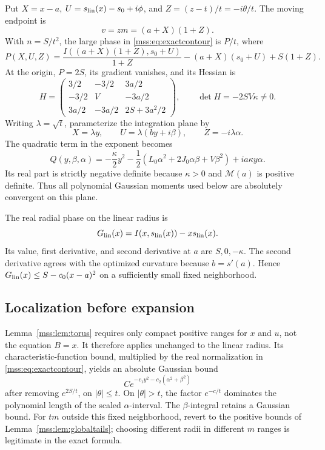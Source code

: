\documentclass[11pt,letterpaper]{article}
\numberwithin{equation}{section}
\theoremstyle{definition}\newtheorem{definition}[theorem]{Definition}
\theoremstyle{remark}\newtheorem{remark}[theorem]{Remark}
\begin{document}
Put $X=x-a$, $U=s_{\rm lin}(x)-s_0+i\phi$, and $Z=(z-t)/t=-i\theta/t$. The moving endpoint is
\begin{equation}\label{mss:eq:movingendpoint}
v=zm=(a+X)(1+Z).
\end{equation}
With $n=S/t^2$, the large phase in \eqref{mss:eq:exactcontour} is $P/t$, where
\begin{equation}\label{mss:eq:P}
P(X,U,Z)=\frac{I((a+X)(1+Z),s_0+U)}{1+Z}
-(a+X)(s_0+U)+S(1+Z).
\end{equation}
At the origin, $P=2S$, its gradient vanishes, and its Hessian is
\begin{equation}\label{mss:eq:Hessian}
H=\begin{pmatrix}
3/2&-3/2&3a/2\\
-3/2&V&-3a/2\\
3a/2&-3a/2&2S+3a^2/2
\end{pmatrix},\qquad
\det H=-2SV\kappa\ne0.
\end{equation}
Writing $\lambda=\sqrt t$, parameterize the integration plane by
\begin{equation}\label{mss:eq:plane}
X=\lambda y,\qquad U=\lambda(by+i\beta),\qquad
Z=-i\lambda\alpha.
\end{equation}
The quadratic term in the exponent becomes
\begin{equation}\label{mss:eq:Q}
Q(y,\beta,\alpha)
=-\frac\kappa2y^2
-\frac12(L_0\alpha^2+2J_0\alpha\beta+V\beta^2)
+ia\kappa y\alpha.
\end{equation}
Its real part is strictly negative definite because $\kappa>0$ and $\mathcal M(a)$ is positive definite. Thus all polynomial Gaussian moments used below are absolutely convergent on this plane.

The real radial phase on the linear radius is
\begin{equation}\label{mss:eq:Glin}
G_{\rm lin}(x)=I(x,s_{\rm lin}(x))-x s_{\rm lin}(x).
\end{equation}
Its value, first derivative, and second derivative at $a$ are $S,0,-\kappa$. The second derivative agrees with the optimized curvature because $b=s'(a)$. Hence $G_{\rm lin}(x)\le S-c_0(x-a)^2$ on a sufficiently small fixed neighborhood.

\subsection{Localization before expansion}
Lemma~\ref{mss:lem:torus} requires only compact positive ranges for $x$ and $u$, not the equation $B=x$. It therefore applies unchanged to the linear radius. Its characteristic-function bound, multiplied by the real normalization in \eqref{mss:eq:exactcontour}, yields an absolute Gaussian bound
\begin{equation}\label{mss:eq:3Dbound}
C e^{-c_1y^2-c_2(\alpha^2+\beta^2)}
\end{equation}
after removing $e^{2S/t}$, on $|\theta|\le t$. On $|\theta|>t$, the factor $e^{-c/t}$ dominates the polynomial length of the scaled $\alpha$-interval. The $\beta$-integral retains a Gaussian bound. For $tm$ outside this fixed neighborhood, revert to the positive bounds of Lemma~\ref{mss:lem:globaltails}; choosing different radii in different $m$ ranges is legitimate in the exact formula.
\end{document}
